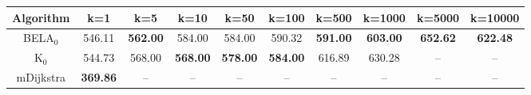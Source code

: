 \begin{tabular}{c|ccccccccc}\toprule
Algorithm & k=1 & k=5 & k=10 & k=50 & k=100 & k=500 & k=1000 & k=5000 & k=10000 \\ \midrule
BELA$_0$ & 546.11 & \textbf{562.00} & 584.00 & 584.00 & 590.32 & \textbf{591.00} & \textbf{603.00} & \textbf{652.62} & \textbf{622.48} \\
K$_0$ & 544.73 & 568.00 & \textbf{568.00} & \textbf{578.00} & \textbf{584.00} & 616.89 & 630.28 & -- & -- \\
mDijkstra & \textbf{369.86} & -- & -- & -- & -- & -- & -- & -- & -- \\ \bottomrule 
\end{tabular}
